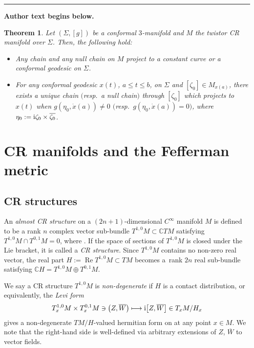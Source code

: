 \documentclass[11pt]{article}
\numberwithin{equation}{section}
\newcommand\ol{\overline}
\numberwithin{equation}{section}
\newtheorem{Theorem}{Theorem}[section]
\begin{document}
\medskip\hrule\medskip\noindent\textbf{Author text begins below.}\par
\setcounter{section}{1}
\begin{Theorem}\label{chain-projection}
Let $(\Sigma, [g])$ be a conformal $3$-manifold and $M$ the twistor CR manifold over $\Sigma$. Then, the following hold:
\begin{itemize}\itemsep=0pt
\item[$(1)$] Any chain and any null chain on $M$ project to a constant curve or a conformal geodesic on $\Sigma$.
\item[$(2)$] For any conformal geodesic $x(t)$, $a\le t\le b$, on $\Sigma$ and $[\zeta_0]\in M_{x(a)}$, there exists a unique chain $($resp.\ a null chain$)$ through $[\zeta_0]$ which projects to $x(t)$ when $g(\eta_0, \dot x(a))\neq0$ $($resp.\ $g(\eta_0, \dot x(a))=0)$, where $\eta_0:= {\rm i}\zeta_0\times \ol{\zeta_0}$.
\end{itemize}
\end{Theorem}



\section{CR manifolds and the Fefferman metric}\label{CR}
\subsection{CR structures}
An {\it almost CR structure} on a $(2n+1)$-dimensional $C^\infty$ manifold $M$ is defined to be a rank $n$ complex vector sub-bundle $T^{1, 0}M\subset\mathbb{C}TM$ satisfying $T^{1, 0}M\cap T^{0, 1}M=0$, where \smash{${T^{0, 1}M:=\ol{T^{1, 0}M}}$}. If the space of sections of $T^{1, 0}M$ is closed under the Lie bracket, it is called a {\it CR structure}. Since $T^{1, 0}M$ contains no non-zero real vector, the real part $H:=\operatorname{Re} T^{1, 0}M\subset TM$ becomes a~rank $2n$ real sub-bundle satisfying $\mathbb{C}H=T^{1, 0}M\oplus T^{0,1}M$.

We say a CR structure $T^{1, 0}M$ is {\it non-degenerate} if $H$ is a contact distribution, or equivalently, the {\it Levi form}
\[
T^{1, 0}_xM\times T^{0, 1}_xM\ni\bigl(Z, \ol W\bigr)\longmapsto {\rm i}\bigl[Z, \ol W\bigr]
\in T_xM/H_x
\]
gives a non-degenerate $TM/H$-valued hermitian form on  at any point $x\in M$. We note that the right-hand side is well-defined via arbitrary extensions of $Z$, $\ol W$ to vector fields.
\end{document}
